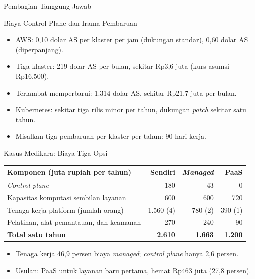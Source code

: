 \documentclass[aspectratio=169, table, 12pt]{beamer}
\begin{document}
\begin{frame}{{\Large Pembagian Tanggung Jawab}}
  \centering
\end{frame}

\begin{frame}{{\Large Biaya Control Plane dan Irama Pembaruan}}
  \vspace{6pt}
  \begin{itemize}
    \item AWS: 0,10 dolar AS per klaster per jam (dukungan standar), 0,60
          dolar AS (diperpanjang).
    \item Tiga klaster: 219 dolar AS per bulan, sekitar Rp3,6 juta (kurs
          asumsi Rp16.500).
    \item Terlambat memperbarui: 1.314 dolar AS, sekitar Rp21,7 juta per
          bulan.
    \item Kubernetes: sekitar tiga rilis minor per tahun, dukungan
          \textit{patch} sekitar satu tahun.
    \item Misalkan tiga pembaruan per klaster per tahun: 90 hari kerja.
  \end{itemize}
\end{frame}

\begin{frame}{{\Large Kasus Medikara: Biaya Tiga Opsi}}
  \scriptsize
  \begin{tabularx}{\textwidth}{>{\raggedright\arraybackslash}X r r r}
    \hline
    \textbf{Komponen (juta rupiah per tahun)} & \textbf{Sendiri} &
      \textbf{\textit{Managed}} & \textbf{PaaS} \\
    \hline
    \textit{Control plane} & 180 & 43 & 0 \\
    \hline
    Kapasitas komputasi sembilan layanan & 600 & 600 & 720 \\
    \hline
    Tenaga kerja platform (jumlah orang) & 1.560 (4) & 780 (2) & 390 (1) \\
    \hline
    Pelatihan, alat pemantauan, dan keamanan & 270 & 240 & 90 \\
    \hline
    \textbf{Total satu tahun} & \textbf{2.610} & \textbf{1.663} &
      \textbf{1.200} \\
    \hline
  \end{tabularx}

  \vspace{8pt}
  \small
  \begin{itemize}
    \item Tenaga kerja 46,9 persen biaya \textit{managed}; \textit{control
          plane} hanya 2,6 persen.
    \item Usulan: PaaS untuk layanan baru pertama, hemat Rp463 juta (27,8
          persen).
  \end{itemize}
\end{frame}
\end{document}
